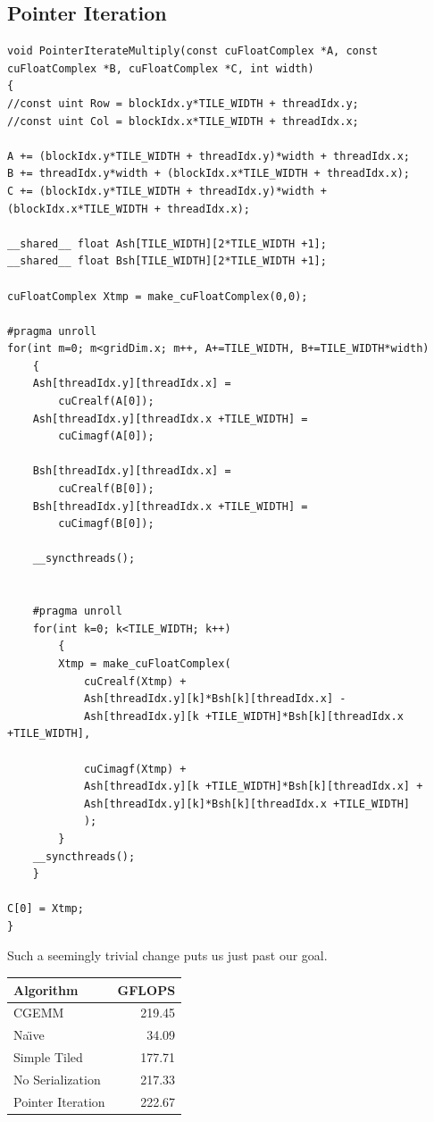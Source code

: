 \documentclass[a4paper,12pt]{report}
\newenvironment{CUDAtiming}%
{\setlength{\extrarowheight}{1.5pt} \begin{center}\begin{tabular}{l|r} Algorithm & GFLOPS\\\hline}%
{\end{tabular}\end{center}}
\begin{document}
\subsection{Pointer Iteration}
\begin{lstlisting}[float,caption=Tiled Matrix Multiplication Kernel Using Pointer Iteration, label=lst:pointerIteration_kernel]
void PointerIterateMultiply(const cuFloatComplex *A, const cuFloatComplex *B, cuFloatComplex *C, int width)
{
//const uint Row = blockIdx.y*TILE_WIDTH + threadIdx.y;
//const uint Col = blockIdx.x*TILE_WIDTH + threadIdx.x;

A += (blockIdx.y*TILE_WIDTH + threadIdx.y)*width + threadIdx.x;
B += threadIdx.y*width + (blockIdx.x*TILE_WIDTH + threadIdx.x);
C += (blockIdx.y*TILE_WIDTH + threadIdx.y)*width + (blockIdx.x*TILE_WIDTH + threadIdx.x);

__shared__ float Ash[TILE_WIDTH][2*TILE_WIDTH +1];
__shared__ float Bsh[TILE_WIDTH][2*TILE_WIDTH +1];

cuFloatComplex Xtmp = make_cuFloatComplex(0,0);

#pragma unroll
for(int m=0; m<gridDim.x; m++, A+=TILE_WIDTH, B+=TILE_WIDTH*width)
	{
	Ash[threadIdx.y][threadIdx.x] =
		cuCrealf(A[0]);
	Ash[threadIdx.y][threadIdx.x +TILE_WIDTH] =
		cuCimagf(A[0]);
	
	Bsh[threadIdx.y][threadIdx.x] =
		cuCrealf(B[0]);
	Bsh[threadIdx.y][threadIdx.x +TILE_WIDTH] =
		cuCimagf(B[0]);
	
	__syncthreads();


	#pragma unroll
	for(int k=0; k<TILE_WIDTH; k++)
		{
		Xtmp = make_cuFloatComplex(
			cuCrealf(Xtmp) +
			Ash[threadIdx.y][k]*Bsh[k][threadIdx.x] -
			Ash[threadIdx.y][k +TILE_WIDTH]*Bsh[k][threadIdx.x +TILE_WIDTH],
			
			cuCimagf(Xtmp) +
			Ash[threadIdx.y][k +TILE_WIDTH]*Bsh[k][threadIdx.x] +
			Ash[threadIdx.y][k]*Bsh[k][threadIdx.x +TILE_WIDTH]
			);
		}
	__syncthreads();
	}

C[0] = Xtmp;
}
\end{lstlisting}

Such a seemingly trivial change puts us just past our goal.

\begin{CUDAtiming}
CGEMM & 219.45\\
Na{\"\i}ve & 34.09\\
Simple Tiled & 177.71\\
No Serialization & 217.33\\
Pointer Iteration & 222.67
\end{CUDAtiming}
\end{document}
